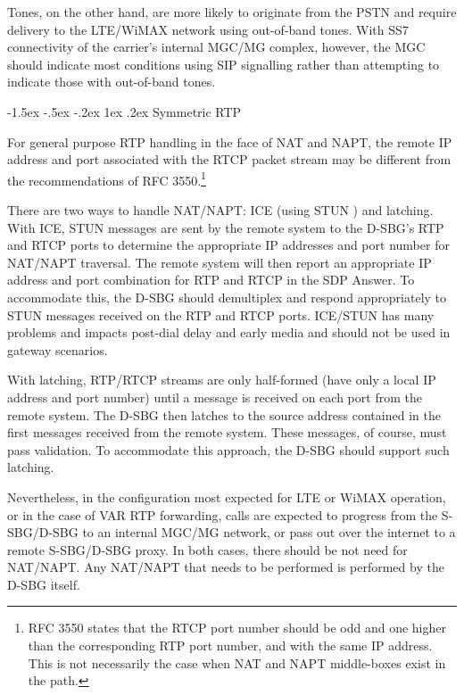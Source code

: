 \documentclass[letterpaper,final,notitlepage,twocolumn,10pt,twoside]{article}
\makeatletter
\let\normalsize = \small
\let\small = \footnotesize
\let\footnotesize = \scriptsize
\let\scriptsize = \tiny
\renewcommand\subsection{\@startsection{subsection}{2}{\z@}%
                                     {-1.5ex \@plus -.5ex \@minus -.2ex}%
                                     {1ex \@plus .2ex}%
                                     {\normalfont\normalsize\bfseries}}
\makeatother
\begin{document}
Tones, on the other hand, are more likely to originate from the PSTN and require
delivery to the LTE/WiMAX network using out-of-band tones.  With SS7
connectivity of the carrier's internal MGC/MG complex, however, the MGC should
indicate most conditions using SIP signalling rather than attempting to indicate
those with out-of-band tones.

\subsection{Symmetric RTP}
\label{section:symrtp}

For general purpose RTP handling in the face of NAT and NAPT, the remote IP
address and port associated with the RTCP packet stream may be different from
the recommendations of RFC
3550.\footnote{RFC 3550 states that the RTCP port number should be odd and one
higher than the corresponding RTP port number, and with the same IP address.
This is not necessarily the case when NAT and NAPT middle-boxes exist in the
path.}

There are two ways to handle NAT/NAPT: ICE \cite{ICE} (using STUN \cite{STUN})
and latching.  With ICE, STUN messages are sent by the remote system to the
D-SBG's RTP and RTCP ports to determine the appropriate IP addresses and port
number for NAT/NAPT traversal.  The remote system will then report an
appropriate IP address and port combination for RTP and RTCP in the SDP Answer.
To accommodate this, the D-SBG should demultiplex and respond appropriately to
STUN messages received on the RTP and RTCP ports.  ICE/STUN has many problems
and impacts post-dial delay and early media and should not be used in gateway
scenarios.

With latching, RTP/RTCP streams are only half-formed (have only a local IP
address and port number) until a message is received on each port from the
remote system.  The D-SBG then latches to the source address contained in the
first messages received from the remote system.  These messages, of course, must
pass validation.  To accommodate this approach, the D-SBG should support such
latching.

Nevertheless, in the configuration most expected for LTE or WiMAX operation, or
in the case of VAR RTP forwarding, calls are expected to progress from the
S-SBG/D-SBG to an internal MGC/MG network, or pass out over the internet to a
remote S-SBG/D-SBG proxy.  In both cases, there should be not need for NAT/NAPT.
Any NAT/NAPT that needs to be performed is performed by the D-SBG itself.
\end{document}
